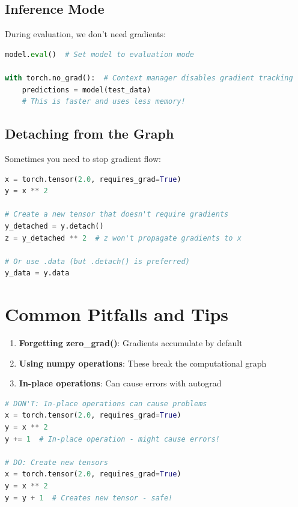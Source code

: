 \documentclass{article}
\begin{document}
\subsection{Inference Mode}

During evaluation, we don't need gradients:

\begin{lstlisting}[language=Python]
model.eval()  # Set model to evaluation mode

with torch.no_grad():  # Context manager disables gradient tracking
    predictions = model(test_data)
    # This is faster and uses less memory!
\end{lstlisting}

\subsection{Detaching from the Graph}

Sometimes you need to stop gradient flow:

\begin{lstlisting}[language=Python]
x = torch.tensor(2.0, requires_grad=True)
y = x ** 2

# Create a new tensor that doesn't require gradients
y_detached = y.detach()
z = y_detached ** 2  # z won't propagate gradients to x

# Or use .data (but .detach() is preferred)
y_data = y.data
\end{lstlisting}

\section{Common Pitfalls and Tips}

\begin{tcolorbox}[colback=red!5!white, colframe=red!50!black, title=Common Mistakes]
\begin{enumerate}
    \item \textbf{Forgetting zero\_grad()}: Gradients accumulate by default
    \item \textbf{Using numpy operations}: These break the computational graph
    \item \textbf{In-place operations}: Can cause errors with autograd
\end{enumerate}
\end{tcolorbox}

\begin{lstlisting}[language=Python]
# DON'T: In-place operations can cause problems
x = torch.tensor(2.0, requires_grad=True)
y = x ** 2
y += 1  # In-place operation - might cause errors!

# DO: Create new tensors
x = torch.tensor(2.0, requires_grad=True)
y = x ** 2
y = y + 1  # Creates new tensor - safe!
\end{lstlisting}
\end{document}

